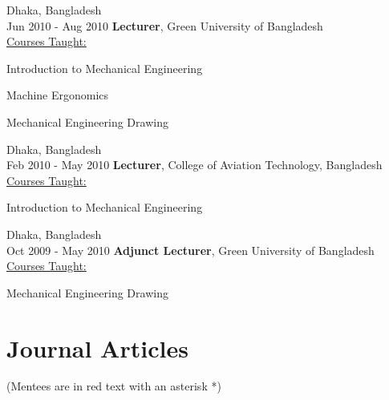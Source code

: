 \documentclass[11pt, letterpaper]{article}
\begin{document}
        \begin{twocolentry}{
        Dhaka, Bangladesh\\
        Jun 2010 - Aug 2010
    }
        \textbf{Lecturer}, Green University of Bangladesh\\
        \uline{Courses Taught:} 
            \begin{highlightsforbulletentries}
                \item Introduction to Mechanical Engineering
                \item Machine Ergonomics
                \item Mechanical Engineering Drawing
            \end{highlightsforbulletentries}
    \end{twocolentry}
    \vspace{5 pt}

    \begin{twocolentry}{
       Dhaka, Bangladesh\\
        Feb 2010 - May 2010
    }
        \textbf{Lecturer}, College of Aviation Technology, Bangladesh\\
        \uline{Courses Taught:} 
            \begin{highlightsforbulletentries}
                \item Introduction to Mechanical Engineering
            \end{highlightsforbulletentries}
    \end{twocolentry}
    \vspace{5 pt}

        \begin{twocolentry}{
       Dhaka, Bangladesh\\
        Oct 2009 - May 2010
    }
        \textbf{Adjunct Lecturer}, Green University of Bangladesh\\
        \uline{Courses Taught:} 
            \begin{highlightsforbulletentries}
                \item Mechanical Engineering Drawing
            \end{highlightsforbulletentries}
    \end{twocolentry}
    \vspace{5 pt}

\section{Journal Articles}
(Mentees are in red text with an asterisk *)
\nocite{*}
\begin{refcontext}[labelprefix=J]
    \printbibliography[heading=none, type=article, title={Journal Articles}]
\end{refcontext}
\end{document}
